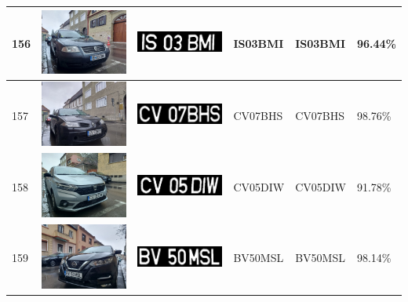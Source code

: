 \documentclass[a4paper,12pt]{report}
\begin{document}
\begin{longtable}{| m{0.6cm} | m{3cm} | m{3cm} | m{1.8cm} | m{1.8cm} | m{1.8cm} |}
    156 & \includegraphics[width=3cm,keepaspectratio]{dataset/93_s1.jpg}  & \includegraphics[width=3cm,keepaspectratio]{segmentari/156.jpg} & IS03BMI             & IS03BMI              & 96.44\%    \\ \hline
    157 & \includegraphics[width=3cm,keepaspectratio]{dataset/94_s1.jpg}  & \includegraphics[width=3cm,keepaspectratio]{segmentari/157.jpg} & CV07BHS             & CV07BHS              & 98.76\%    \\ \hline
    158 & \includegraphics[width=3cm,keepaspectratio]{dataset/95_s1.jpg}  & \includegraphics[width=3cm,keepaspectratio]{segmentari/158.jpg} & CV05DIW             & CV05DIW              & 91.78\%    \\ \hline
    159 & \includegraphics[width=3cm,keepaspectratio]{dataset/96_d1.jpg}  & \includegraphics[width=3cm,keepaspectratio]{segmentari/159.jpg} & BV50MSL             & BV50MSL              & 98.14\%    \\ \hline

\end{longtable}
\end{document}
